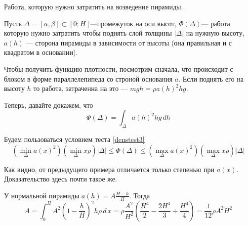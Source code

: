 \documentclass{article}
\newcommand{\emdash}{---}
\newcommand{\nocomma}{}
{\theorembodyfont{\rmfamily}\newtheorem{example}{\CYRP\cyrr\cyri\cyrm\cyre\cyrr}}
\begin{document}
\begin{example}
  Работа, которую нужно затратить на
  возведение пирамиды.
  
  Пусть $\Delta = \left[ \alpha, \beta \right] \subset \left[ 0 ; H
  \right]${\emdash}промежуток на оси высот, $\Phi \left(
  \Delta \right) ${\emdash} работа которую нужно
  затратить чтобы поднять слой толщины $\left|
  \Delta \right|$ на нужную высоту, $a \left( h \right)$
  {\emdash} сторона пирамиды в зависимости от
  высоты (она правильная и с квадратом в
  основании).
  
  Чтобы получить функцию плотности,
  посмотрим сначала, что происходит с
  блоком в форме параллелепипеда со
  строной основания $a$. Если поднять его на
  высоту $h$ то работа, затраченна на это
  {\emdash} $mgh = \rho a \left( h \right)^2 hg$.
  
  Теперь, давайте докажем, что
  \[ \Phi \left( \Delta \right) = \int_{\Delta} a \left( h \right)^2 hg \, d
     \nocomma h \]
  
  
  Будем пользоваться условием теста
  \ref{denstest3}
  \[ \left( \min_{\Delta} a \left( x \right)^2 \right)  \left( \min_{\Delta}
     x \rho \right)  \left| \Delta \right| \leqslant \Phi \left( \Delta
     \right) \leqslant \left( \max_{\Delta} a \left( x \right)^2 \right) 
     \left( \max_{\Delta} x \rho \right) \left| \Delta \right| \]
  
  
  Как видно, от предыдущего примера
  отличается только степенью при $a \left( x
  \right)$. Доказательство здесь почти такое
  же.
  
  У нормальной пирамиды $a \left( h \right) = A \frac{H -
  h}{H}$. Тогда
  \[ A = \int_0^H A^2  \left( 1 - \frac{h}{H} \right)^2 h \rho \, d \, x =
     \rho \frac{A^2}{H^2}  \left( \frac{H^4}{2} - \frac{2 H^4}{3} +
     \frac{H^4}{4} \right) = \frac{1}{12} \rho A^2 H^2 \]
  
\end{example}
\end{document}
